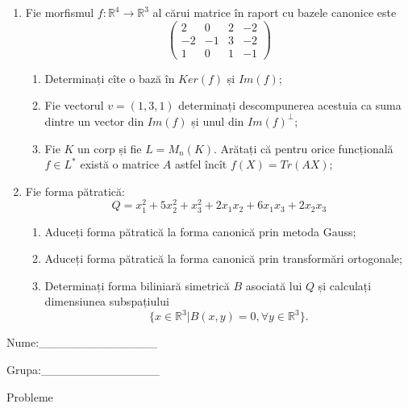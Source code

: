 \documentclass{article}
\begin{document}
\begin{enumerate}
 \item Fie morfismul $f:\mathbb{R}^4 \to \mathbb{R}^3$ al cărui matrice în raport cu bazele canonice este
$$\begin{pmatrix}
2&0&2&-2\\
-2&-1&3&-2\\
1&0&1&-1
\end{pmatrix}$$

\begin{enumerate}
\item Determinați cîte o bază în $Ker(f)$ și $Im(f)$;
\item Fie vectorul $v=(1,3,1)$ determinați descompunerea acestuia ca suma dintre un vector din $Im(f)$ și unul din $Im(f)^\perp$;
\item Fie $K$ un corp și fie $L=M_n(K)$. Arătați că pentru orice funcțională $f \in L^*$ există o matrice $A$ astfel încît $f(X)=Tr(AX)$;
\end{enumerate}
\item Fie forma pătratică:
$$Q= x_1^2+5x_2^2+x_3^2+2x_1x_2+6x_1x_3+2x_2x_3$$

\begin{enumerate}
\item Aduceți forma pătratică la forma canonică prin metoda Gauss;
\item Aduceți forma pătratică la forma canonică prin transformări ortogonale;
\item Determinați forma biliniară simetrică $B$ asociată lui $Q$ și calculați dimensiunea subspațiului
$$\{x \in \mathbb{R}^3 | B(x,y)=0,\forall y \in \mathbb{R}^3\}.$$

\end{enumerate}
\end{enumerate}
\newpage
\begin{flushright}
Nume:\_\_\_\_\_\_\_\_\_\_\_\_\_\_
 
 
Grupa:\_\_\_\_\_\_\_\_\_\_\_\_\_\_
\end{flushright}
\begin{center}
\vspace{2cm}
{\Large Probleme}
\vspace{2cm}
\end{center}
\end{document}
